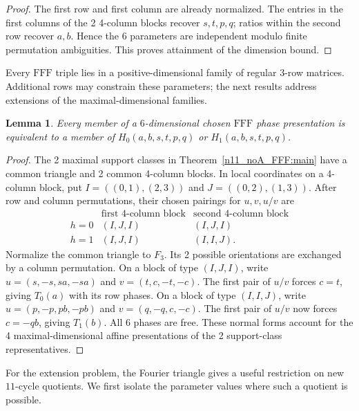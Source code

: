 \documentclass[11pt,a4paper]{article}
\newtheorem{lemma}[theorem]{Lemma}
\theoremstyle{plain}
\theoremstyle{definition}
\theoremstyle{plain}
\begin{document}
\begin{proof}
The first row and first column are already normalized. The entries in the first columns of the 2 4-column blocks recover $s,t,p,q$; ratios within the second row recover $a,b$. Hence the 6 parameters are independent modulo finite permutation ambiguities. This proves attainment of the dimension bound.
\end{proof}

Every $\mathrm{FFF}$ triple lies in a positive-dimensional family of regular 3-row matrices. Additional rows may constrain these parameters; the next results address extensions of the maximal-dimensional families.

\par\addvspace{\medskipamount}\noindent
\begin{minipage}{\linewidth}
\begin{lemma}\label{fff_generic:normal}
Every member of a $6$-dimensional chosen $\mathrm{FFF}$ phase presentation is equivalent to a member of $H_0(a,b,s,t,p,q)$ or $H_1(a,b,s,t,p,q)$.
\end{lemma}
\end{minipage}
\par\addvspace{\medskipamount}

\begin{proof}
The 2 maximal support classes in Theorem~\ref{n11_noA_FFF:main} have a common triangle and 2 common 4-column blocks. In local coordinates on a 4-column block, put $I=((0,1),(2,3))$ and $J=((0,2),(1,3))$. After row and column permutations, their chosen pairings for $u,v,u/v$ are
$$\begin{array}{c|cc}
&\text{first 4-column block}&\text{second 4-column block}\\\hline
h=0&(I,J,I)&(I,J,I)\\
h=1&(I,J,I)&(I,I,J).
\end{array}$$
Normalize the common triangle to $F_3$. Its 2 possible orientations are exchanged by a column permutation. On a block of type $(I,J,I)$, write $u=(s,-s,sa,-sa)$ and $v=(t,c,-t,-c)$. The first pair of $u/v$ forces $c=t$, giving $T_0(a)$ with its row phases. On a block of type $(I,I,J)$, write $u=(p,-p,pb,-pb)$ and $v=(q,-q,c,-c)$. The first pair of $u/v$ now forces $c=-qb$, giving $T_1(b)$. All 6 phases are free. These normal forms account for the 4 maximal-dimensional affine presentations of the 2 support-class representatives.
\end{proof}

For the extension problem, the Fourier triangle gives a useful restriction on new $11$-cycle quotients. We first isolate the parameter values where such a quotient is possible.
\end{document}

